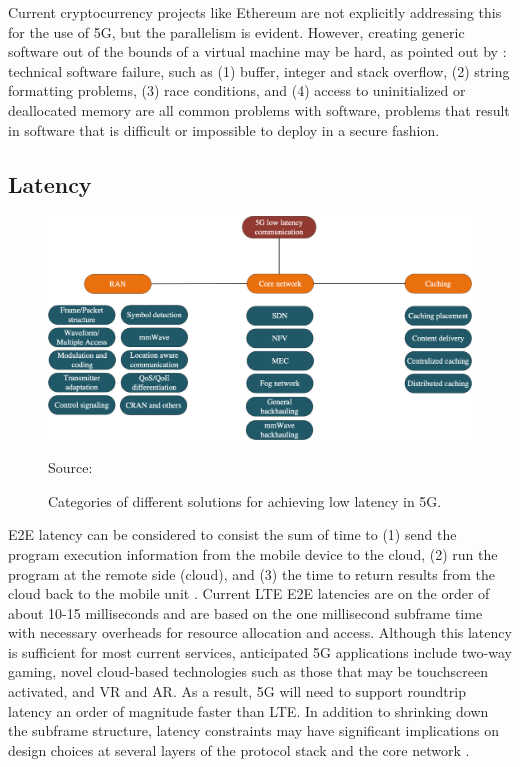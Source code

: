 \documentclass[12pt]{article}
\newcommand{\source}[1]{\caption*{Source: {#1}} }
\begin{document}
Current cryptocurrency projects like Ethereum are not explicitly addressing this for the use of \gls{5G}, but the parallelism is evident. However, creating generic software out of the bounds of a virtual machine may be hard, as pointed out by \cite{whitman2011principles}: technical software failure, such as (1) buffer, integer and stack overflow, (2) string formatting problems, (3) race conditions, and (4) access to uninitialized or deallocated memory are all common problems with software, problems that result in software that is difficult or impossible to deploy in a secure fashion.

\subsection{Latency}

\begin{figure}
  \centering
    \includegraphics[width=\textwidth]{./assets/latency.png}
  \caption{Categories of different solutions for achieving low latency in 5G.}
  \source{\cite{parvez2018survey}}
  \label{fig:latencycat}
\end{figure}

\gls{E2E} latency can be considered to consist the sum of time to (1) send the program execution information from the mobile device to the cloud, (2) run the program at the remote side (cloud), and (3) the time to return results from the cloud back to the mobile unit \cite{barbarossa2014communicating}. Current \gls{LTE} \gls{E2E} latencies are on the order of about 10-15 milliseconds and are based on the one millisecond subframe time with necessary overheads for resource allocation and access. Although this latency is sufficient for most current services, anticipated \gls{5G} applications include two-way gaming, novel cloud-based technologies such as those that may be touchscreen activated, and \gls{VR} and \gls{AR}. As a result, \gls{5G} will need to support roundtrip latency an order of magnitude faster than \gls{LTE}. In addition to shrinking down the subframe structure, latency constraints may have significant implications on design choices at several layers of the protocol stack and the core network \cite{andrews2014will}.
\end{document}
